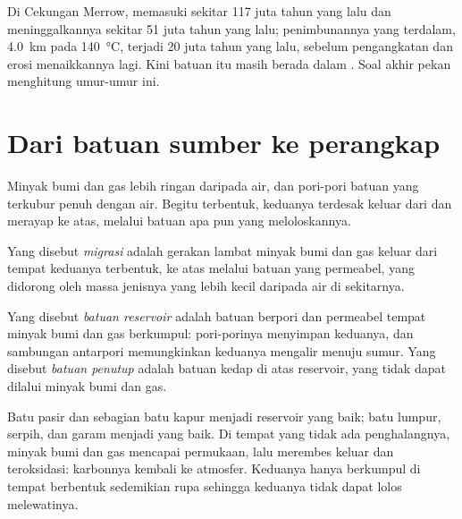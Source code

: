 Di Cekungan Merrow,  memasuki  sekitar 117 juta tahun
yang lalu dan meninggalkannya sekitar 51 juta tahun yang lalu; penimbunannya
yang terdalam, \qty{4.0}{km} pada \qty{140}{\degreeCelsius}, terjadi 20 juta
tahun yang lalu, sebelum pengangkatan dan erosi menaikkannya lagi. Kini batuan
itu masih berada dalam . Soal akhir pekan menghitung umur-umur ini.

\section{Dari batuan sumber ke perangkap}

Minyak bumi dan gas lebih ringan daripada air, dan pori-pori batuan yang
terkubur penuh dengan air. Begitu terbentuk, keduanya terdesak keluar dari
 dan merayap ke atas, melalui batuan apa pun yang meloloskannya.

\begin{definition}[Migrasi]\label{def:g11:fossil-fuel-geology:migration}
Yang disebut \emph{migrasi} adalah gerakan
lambat minyak bumi dan gas keluar dari  tempat keduanya terbentuk,
ke atas melalui batuan yang permeabel, yang didorong oleh massa jenisnya yang
lebih kecil daripada air di sekitarnya.
\end{definition}

\begin{definition}\label{def:g11:fossil-fuel-geology:reservoir}
Yang disebut \emph{batuan reservoir} adalah batuan
berpori dan permeabel tempat minyak bumi dan gas berkumpul: pori-porinya
menyimpan keduanya, dan sambungan antarpori memungkinkan keduanya mengalir
menuju sumur. Yang disebut \emph{batuan penutup} adalah
batuan kedap di atas reservoir, yang tidak dapat dilalui minyak bumi dan gas.
\end{definition}

Batu pasir dan sebagian batu kapur menjadi reservoir yang baik; batu lumpur,
serpih, dan garam menjadi  yang baik. Di tempat yang tidak ada
penghalangnya, minyak bumi dan gas mencapai permukaan, lalu merembes keluar dan
teroksidasi: karbonnya kembali ke atmosfer. Keduanya hanya berkumpul di tempat
 berbentuk sedemikian rupa sehingga keduanya tidak dapat lolos
melewatinya.

